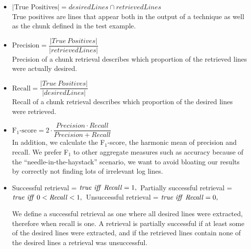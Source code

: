 \documentclass[10pt,journal,compsoc]{IEEEtran}
\begin{document}
\vspace{0.2cm}
\begin{itemize}[leftmargin=0.4cm] \itemsep1em
	\item $|\mbox{True\ Positives}| = \mathit{desiredLines} \cap
	\mathit{retrievedLines}$ \vspace{0.2cm}\\
	True positives are lines that appear both in the output of a
	technique as well as the chunk defined in the
  test example.


	\item $\mbox{Precision} = \dfrac{|\mathit{True\
	Positives}|}{|\mathit{retrievedLines}|}$ \vspace{0.21cm} \\
	Precision of a chunk retrieval describes which proportion of
	the retrieved lines were actually desired.

	\item $\mbox{Recall} =
	\dfrac{|\mathit{True\ Positives}|}{|\mathit{desiredLines}|}$
	\vspace{0.2cm} \\
	Recall of a chunk retrieval describes which proportion of the
	desired lines were retrieved.

	\item $\mbox{F$_{1}$-score} = 2 \cdot \dfrac{\mathit{Precision}
	\cdot \mathit{Recall}}{\mathit{Precision} + \mathit{Recall}}$
	\vspace{0.2cm}\\
	In addition, we calculate the F$_{1}$-score, the harmonic mean
	of precision and recall.
  We prefer F$_{1}$ to other aggregate
	measures such as accuracy because of the
	``needle-in-the-haystack'' scenario, we want to avoid bloating
	our results by correctly not finding lots of irrelevant log
	lines.

	\item Successful retrieval = $\mathit{true}\ \mathit{iff}\
	\mathit{Recall} = 1, \vspace{0.1cm}\\$
	Partially successful retrieval = $\mathit{true}\ \mathit{iff}\
	0<\mathit{Recall}<1, \vspace{0.1cm}\\$
	Unsuccessful retrieval = $\mathit{true}\ \mathit{iff}\
	\mathit{Recall} = 0, \vspace{0.1cm}$

	We define a successful retrieval as one where all desired
	lines were extracted, therefore when recall is one.
	A retrieval is partially successful if at least some of the
	desired lines were extracted,
	and if the retrieved lines contain none of the desired lines
	a retrieval was unsuccessful.
\end{itemize}
\vspace{0.2cm}
\end{document}
